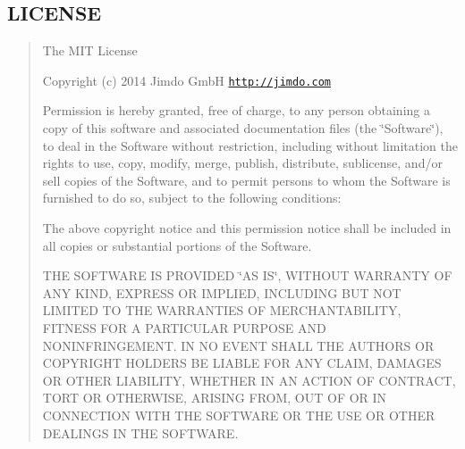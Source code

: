 \subsection*{L\+I\+C\+E\+N\+SE }

\begin{quote}
The M\+IT License

Copyright (c) 2014 Jimdo GmbH \href{http://jimdo.com}{\tt http\+://jimdo.\+com}

Permission is hereby granted, free of charge, to any person obtaining a copy of this software and associated documentation files (the \char`\"{}\+Software\char`\"{}), to deal in the Software without restriction, including without limitation the rights to use, copy, modify, merge, publish, distribute, sublicense, and/or sell copies of the Software, and to permit persons to whom the Software is furnished to do so, subject to the following conditions\+:

The above copyright notice and this permission notice shall be included in all copies or substantial portions of the Software.

T\+HE S\+O\+F\+T\+W\+A\+RE IS P\+R\+O\+V\+I\+D\+ED \char`\"{}\+A\+S I\+S\char`\"{}, W\+I\+T\+H\+O\+UT W\+A\+R\+R\+A\+N\+TY OF A\+NY K\+I\+ND, E\+X\+P\+R\+E\+SS OR I\+M\+P\+L\+I\+ED, I\+N\+C\+L\+U\+D\+I\+NG B\+UT N\+OT L\+I\+M\+I\+T\+ED TO T\+HE W\+A\+R\+R\+A\+N\+T\+I\+ES OF M\+E\+R\+C\+H\+A\+N\+T\+A\+B\+I\+L\+I\+TY, F\+I\+T\+N\+E\+SS F\+OR A P\+A\+R\+T\+I\+C\+U\+L\+AR P\+U\+R\+P\+O\+SE A\+ND N\+O\+N\+I\+N\+F\+R\+I\+N\+G\+E\+M\+E\+NT. IN NO E\+V\+E\+NT S\+H\+A\+LL T\+HE A\+U\+T\+H\+O\+RS OR C\+O\+P\+Y\+R\+I\+G\+HT H\+O\+L\+D\+E\+RS BE L\+I\+A\+B\+LE F\+OR A\+NY C\+L\+A\+IM, D\+A\+M\+A\+G\+ES OR O\+T\+H\+ER L\+I\+A\+B\+I\+L\+I\+TY, W\+H\+E\+T\+H\+ER IN AN A\+C\+T\+I\+ON OF C\+O\+N\+T\+R\+A\+CT, T\+O\+RT OR O\+T\+H\+E\+R\+W\+I\+SE, A\+R\+I\+S\+I\+NG F\+R\+OM, O\+UT OF OR IN C\+O\+N\+N\+E\+C\+T\+I\+ON W\+I\+TH T\+HE S\+O\+F\+T\+W\+A\+RE OR T\+HE U\+SE OR O\+T\+H\+ER D\+E\+A\+L\+I\+N\+GS IN T\+HE S\+O\+F\+T\+W\+A\+RE.\end{quote}
